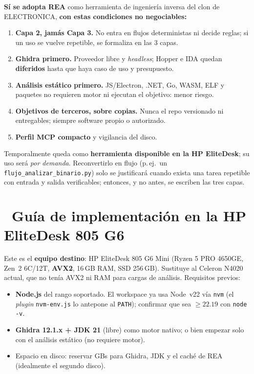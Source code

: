 \documentclass[11pt,a4paper]{article}
\newcommand{\iconotexto}[2]{\textcolor{cyanNeon}{\faIcon{#1}}~#2}
\begin{document}
\begin{tcolorbox}[cajaFortaleza, title={\faIcon{check-double}~Adopción condicional (herramienta, no flujo)}]
\textbf{Sí se adopta REA} como herramienta de ingeniería inversa del clon de ELECTRONICA,
\textbf{con estas condiciones no negociables:}
\begin{enumerate}[leftmargin=1.4em]
  \item \textbf{Capa 2, jamás Capa 3.} No entra en flujos deterministas ni decide reglas;
  si un uso se vuelve repetible, se formaliza en las 3 capas.
  \item \textbf{Ghidra primero.} Proveedor libre y \emph{headless}; Hopper e IDA quedan
  \textbf{diferidos} hasta que haya caso de uso y presupuesto.
  \item \textbf{Análisis estático primero.} JS/Electron, .NET, Go, WASM, ELF y paquetes no
  requieren motor ni ejecutan el objetivo: menor riesgo.
  \item \textbf{Objetivos de terceros, sobre copias.} Nunca el repo versionado ni
  entregables; siempre software propio o autorizado.
  \item \textbf{Perfil MCP compacto} y vigilancia del disco.
\end{enumerate}
\end{tcolorbox}

Temporalmente queda como \textbf{herramienta disponible en la HP EliteDesk}; su uso será
\emph{por demanda}. Reconvertirlo en flujo (p.\,ej.\ un \texttt{flujo\_analizar\_binario.py})
solo se justificará cuando exista una tarea repetible con entrada y salida verificables;
entonces, y no antes, se escriben las tres capas.

\section[Guía en la HP EliteDesk]{\iconotexto{microchip}{Guía de implementación en la HP EliteDesk 805 G6}}

Este es el \textbf{equipo destino}: HP EliteDesk 805 G6 Mini (Ryzen 5 PRO 4650GE, Zen~2
6C/12T, \textbf{AVX2}, 16\,GB RAM, SSD 256\,GB). Sustituye al Celeron N4020 actual, que no
tenía AVX2 ni RAM para cargas de análisis. Requisitos previos:

\begin{itemize}[leftmargin=1.4em]
  \item \textbf{Node.js} del rango soportado. El workspace ya usa Node~v22 vía \texttt{nvm}
  (el \emph{plugin} \texttt{nvm-env.js} lo antepone al \texttt{PATH}); confirmar que sea
  \(\ge 22.19\) con \texttt{node -v}.
  \item \textbf{Ghidra 12.1.x + JDK 21} (libre) como motor nativo; o bien empezar solo con
  el análisis estático (no requiere motor).
  \item Espacio en disco: reservar GBs para Ghidra, JDK y el caché de REA (idealmente el
  segundo disco).
\end{itemize}
\end{document}
